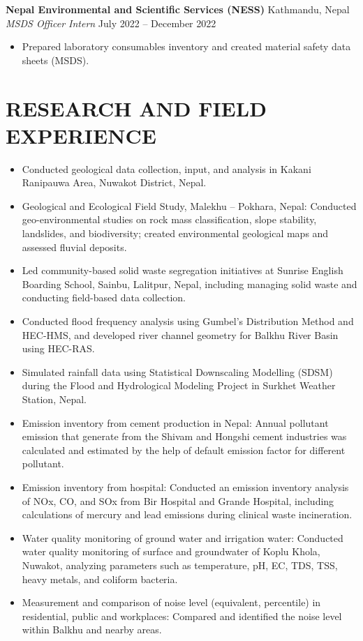 \documentclass[a4paper,9pt]{extarticle}
\begin{document}
\noindent
\textbf{Nepal Environmental and Scientific Services (NESS)} \hfill Kathmandu, Nepal\\ 
\textit{MSDS Officer Intern} \hfill July 2022 -- December 2022
\begin{itemize}
    \item Prepared laboratory consumables inventory and created material safety data sheets (MSDS).
\end{itemize}

\section*{RESEARCH AND FIELD EXPERIENCE}
\begin{itemize}
    \item Conducted geological data collection, input, and analysis in Kakani Ranipauwa Area, Nuwakot District, Nepal.
    \item Geological and Ecological Field Study, Malekhu – Pokhara, Nepal: Conducted geo-environmental studies on rock mass classification, slope stability, landslides, and biodiversity; created environmental geological maps and assessed fluvial deposits.
    \item Led community-based solid waste segregation initiatives at Sunrise English Boarding School, Sainbu, Lalitpur, Nepal, including managing solid waste and conducting field-based data collection.
    \item Conducted flood frequency analysis using Gumbel’s Distribution Method and HEC-HMS, and developed river channel geometry for Balkhu River Basin using HEC-RAS.
    \item Simulated rainfall data using Statistical Downscaling Modelling (SDSM) during the Flood and Hydrological Modeling Project in Surkhet Weather Station, Nepal.
    \item Emission inventory from cement production in Nepal:  Annual pollutant emission that generate from the Shivam and Hongshi cement industries was calculated and estimated by the help of default emission factor for different pollutant.
    \item Emission inventory from hospital: Conducted an emission inventory analysis of NOx, CO, and SOx from Bir Hospital and Grande Hospital, including calculations of mercury and lead emissions during clinical waste incineration.
    \item Water quality monitoring of ground water and irrigation water: Conducted water quality monitoring of surface and groundwater of Koplu Khola, Nuwakot, analyzing parameters such as temperature, pH, EC, TDS, TSS, heavy metals, and coliform bacteria.
    \item Measurement and comparison of noise level (equivalent, percentile) in residential, public and workplaces: Compared and identified the noise level within Balkhu and nearby areas.
\end{itemize}
\end{document}
